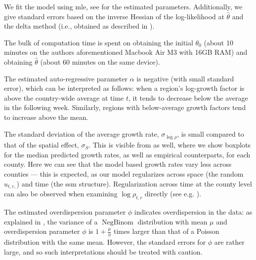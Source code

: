 

We fit the model using \gls{mle}, see  for the estimated parameters. Additionally, we give standard errors based on the inverse Hessian of the log-likelihood at $\hat \theta$ and the delta method (i.e., obtained as described in ). 

The bulk of computation time is spent on obtaining the initial $\theta_{0}$ (about 10 minutes on the authors aforementioned Macbook Air M3 with 16GB RAM) and obtaining $\hat\theta$ (about 60 minutes on the same device).

The estimated auto-regressive parameter $\alpha$ is negative (with small standard error), which can be interpreted as follows: when a region's log-growth factor is above the country-wide average at time $t$, it tends to decrease below the average in the following week. Similarly, regions with below-average growth factors tend to increase above the mean. 

The standard deviation of the average growth rate, $\sigma_{\overline{\log \rho}}$, is small compared to that of the spatial effect, $\sigma_{S}$. This is visible from  as well, where we show boxplots for the median predicted growth rates, as well as empirical counterparts, for each county. Here we can see that the model based growth rates vary less across counties --- this is expected, as our model regularizes across space (the random $u_{t,r,}$) and time (the \gls{ssm} structure).
Regularization across time at the county level can also be observed when examining $\log \rho_{t,r}$ directly (see e.g. ).

\begin{table}
    \centering
    
    \caption{Estimated parameters and standard errors (using the delta method) for the regional showcase model.}
    \label{tab:regional_showcase_theta}
\end{table}

The estimated overdispersion parameter $\phi$ indicates overdispersion in the data: as explained in , the variance of a $\operatorname{NegBinom}$ distribution with mean $\mu$ and overdispersion parameter $\phi$ is $1 + \frac{\mu}{\phi}$ times larger than that of a Poisson distribution with the same mean. However, the standard errors for $\phi$ are rather large, and so such interpretations should be treated with caution. 

